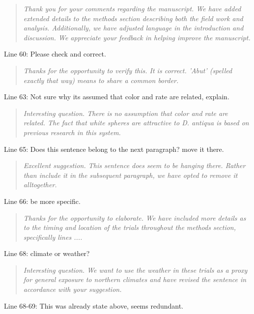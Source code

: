 \documentclass{article}
\begin{document}
\begin{quote}
    \textit{Thank you for your comments regarding the manuscript.  We have added extended details to the methods section describing both the field work and analysis.  Additionally, we have adjusted language in the introduction and discussion.  We appreciate your feedback in helping improve the manuscript.  }
\end{quote}

Line 60: Please check and correct.  

\begin{quote}
    \textit{Thanks for the opportunity to verify this.  It is correct.  'Abut' (spelled exactly that way) means to share a common border. }
\end{quote}

Line 63: Not sure why its assumed that color and rate are related, explain.  

\begin{quote}
    \textit{Interesting question.  There is no assumption that color and rate are related.  The fact that white spheres are attractive to \textit{D. antiqua} is based on previous research in this system.  }
\end{quote}

Line 65: Does this sentence belong to the next paragraph? move it there.

\begin{quote}
    \textit{Excellent suggestion.  This sentence does seem to be hanging there.  Rather than include it in the subsequent paragraph, we have opted to remove it alltogether.  }
\end{quote}

Line 66: be more specific.  

\begin{quote}
    \textit{Thanks for the opportunity to elaborate.  We have included more details as to the timing and location of the trials throughout the methods section, specifically lines .... }
\end{quote}


Line 68: climate or weather?

\begin{quote}
    \textit{Interesting question.  We want to use the weather in these trials as a proxy for general exposure to northern climates and have revised the sentence in accordance with your suggestion.  }
\end{quote}


Line 68-69: This was already state above, seems redundant.
\end{document}
